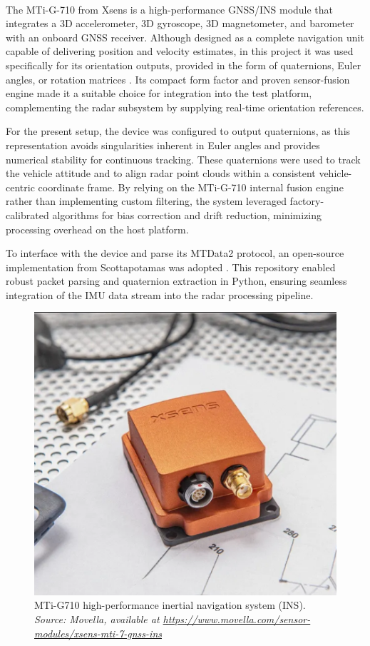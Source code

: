 \vspace{0.5em}
\hfill
\\
\indent The MTi-G-710 from Xsens is a high-performance GNSS/INS module that integrates a 3D accelerometer, 3D gyroscope, 3D magnetometer, and barometer with an onboard GNSS receiver.  
Although designed as a complete navigation unit capable of delivering position and velocity estimates, in this project it was used specifically for its orientation outputs, provided in the form of quaternions, Euler angles, or rotation matrices \cite{mti710_manual}.  
Its compact form factor and proven sensor-fusion engine made it a suitable choice for integration into the test platform, complementing the radar subsystem by supplying real-time orientation references.  

For the present setup, the device was configured to output quaternions, as this representation avoids singularities inherent in Euler angles and provides numerical stability for continuous tracking.  
These quaternions were used to track the vehicle attitude and to align radar point clouds within a consistent vehicle-centric coordinate frame.  
By relying on the MTi-G-710 internal fusion engine rather than implementing custom filtering, the system leveraged factory-calibrated algorithms for bias correction and drift reduction, minimizing processing overhead on the host platform.  

To interface with the device and parse its MTData2 protocol, an open-source implementation from Scottapotamas was adopted \cite{xsens_repo}.  
This repository enabled robust packet parsing and quaternion extraction in Python, ensuring seamless integration of the IMU data stream into the radar processing pipeline.  

\begin{figure}[!htbp]
    \centering
    \includegraphics[width=0.65\linewidth]{images/mti_g710.png}
    \caption{MTi-G710 high-performance inertial navigation system (INS).\\
    \textit{Source: Movella, available at \url{https://www.movella.com/sensor-modules/xsens-mti-7-gnss-ins}}}
    \label{fig:MTi-G710 sensor}
\end{figure}

